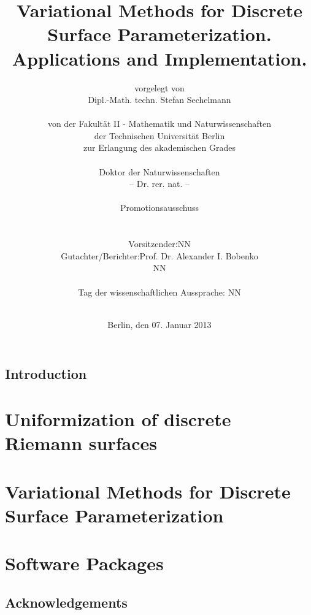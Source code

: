 \documentclass[a4paper]{book}
\title{Variational Methods for Discrete Surface Parameterization. Applications and Implementation.}
\author{
vorgelegt von\\
Dipl.-Math. techn. Stefan Sechelmann\\
\vspace{0.3cm}\\
von der Fakult{\"a}t II - Mathematik und Naturwissenschaften\\
der Technischen Universit{\"a}t Berlin\\
zur Erlangung des akademischen Grades\\
\vspace{0.3cm}\\
Doktor der Naturwissenschaften\\
-- Dr. rer. nat. --\\
\vspace{2cm}\\
Promotionsausschuss\\
\vspace{0.3cm}\\
\begin{tabular}{rl}
Vorsitzender: & NN \\
Gutachter/Berichter: & Prof. Dr. Alexander I. Bobenko \\
& NN 
\end{tabular}
\vspace{0.3cm}\\
Tag der wissenschaftlichen Aussprache: NN\\
\vspace{2cm}\\
}
\date{Berlin, den 07. Januar 2013}
\begin{document}
\frontmatter
\maketitle
\newpage

\tableofcontents
\newpage
\listoffigures

\newpage
\mainmatter
\setcounter{secnumdepth}{-1} 
\chapter{Introduction}
\setcounter{secnumdepth}{2} 
\part{Uniformization of discrete Riemann surfaces}
%
\part{Variational Methods for Discrete Surface Parameterization}
%
%
%
\part{Software Packages}





\newpage
\backmatter 

\setcounter{secnumdepth}{-1} 


\chapter{Acknowledgements}
\end{document}

